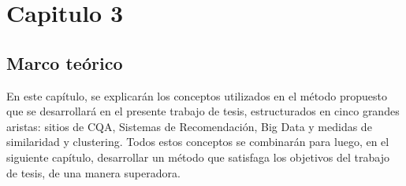 \chapter*{Capitulo 3}\label{ch:marcoteorico}
\section{Marco teórico}
\noindent En este capítulo, se explicarán los conceptos utilizados en el método propuesto que se desarrollará en el presente trabajo de tesis, estructurados en cinco grandes aristas: sitios de CQA, Sistemas de Recomendación, Big Data y medidas de similaridad y clustering. Todos estos conceptos se combinarán para luego, en el siguiente capítulo, desarrollar un método que satisfaga los objetivos del trabajo de tesis, de una manera superadora.







